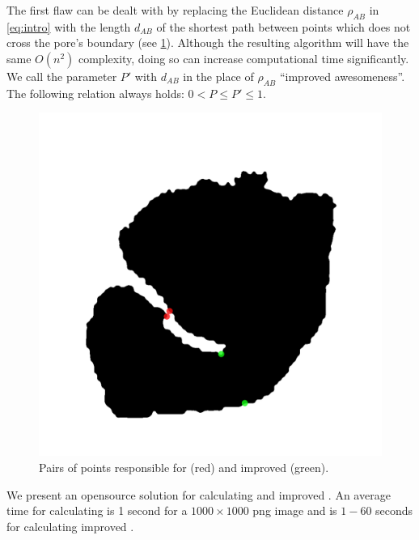 \documentclass[reprint,amsmath,amssymb,aps,pre,showkeys,showpacs]{revtex4-1}
\newcommand{\highlight}[1]{{\color{red}{#1}}} %
\begin{document}
The first flaw can be dealt with by replacing the Euclidean distance $\rho_{AB}$
in \cref{eq:intro} with the length $d_{AB}$ of the shortest path between points
which does not cross the pore's boundary (see \cref{fig:improved}). Although the
resulting algorithm will have the same $O(n^2)$ complexity, doing so can
increase computational time significantly. We call the parameter $P'$ with
$d_{AB}$ in the place of $\rho_{AB}$ ``improved awesomeness''. The following
relation always holds: $0 < P \le P' \le 1$.
\begin{figure}
  \centering
  \includegraphics[width=0.9\linewidth,frame]{images/improved.png}
  \caption[]{Pairs of points responsible for \highlight{awesomeness} (red) and
    improved \highlight{awesomeness} (green).}
  \label{fig:improved}
\end{figure}

We present an opensource solution for calculating \highlight{awesomeness} and
improved \highlight{awesomeness}. \highlight{E-mail us and buy us coffee so we
  can send this super program to you, no matter where you live! Hurry, this is a
limited offer!} An average time for calculating \highlight{awesomeness} is 1
second for a $1000 \times 1000$ png image and is $1-60$ seconds for calculating
improved \highlight{awesomeness}.


\end{document}
